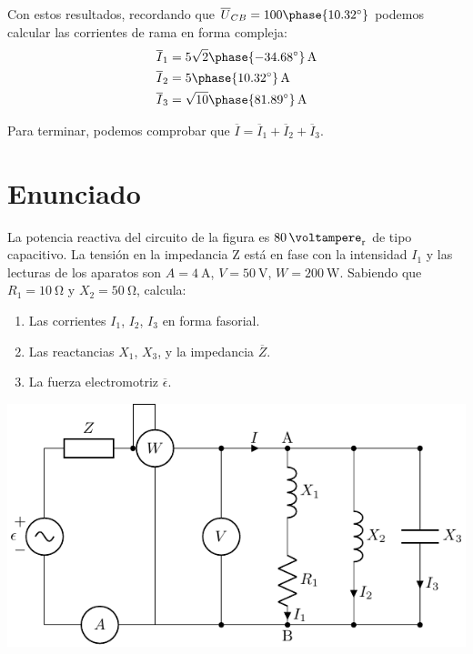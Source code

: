 Con estos resultados, recordando que  $\overline{U}_{CB} =
100\phase{\ang{10.32}}$ podemos calcular las corrientes de rama en forma
compleja:
\begin{align*}
  \overline{I}_1 &=  {5\sqrt{2}\phase{\ang{-34.68}}}\,\si{\ampere}\\
  \overline{I}_2 &=  {5\phase{\ang{10.32}}}\,\si{\ampere}\\
  \overline{I}_3 &=
  {\sqrt{10}\phase{\ang{81.89}}}\,\si{\ampere}
\end{align*}

Para terminar, podemos comprobar que $\overline{I} = \overline{I}_1
+ \overline{I}_2 + \overline{I}_3$.


\section{Enunciado}

La potencia reactiva del circuito de la figura es $\qty{80}{\voltampere_r}$ de tipo capacitivo. La tensión en la impedancia Z está en fase con la intensidad $I_1$ y las lecturas de los aparatos son $A = \qty{4}{\ampere}$, $V = \qty{50}{\volt}$, $W = \qty{200}{\watt}$. Sabiendo que $R_1 = \qty{10}{\ohm}$ y $X_2 = \qty{50}{\ohm}$, calcula:

\begin{enumerate}
\item Las corrientes $I_1$, $I_2$, $I_3$ en forma fasorial.
\item Las reactancias $X_1$, $X_3$, y la impedancia $\overline{Z}$.
\item La fuerza electromotriz $\overline{\epsilon}$.
\end{enumerate}
\begin{center}
  \includegraphics{figuras/BT2_circuitoCapacitivo}
\end{center}

